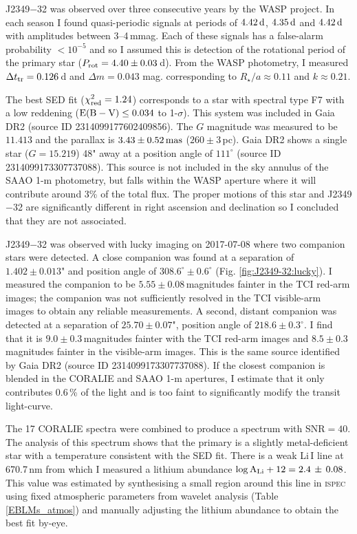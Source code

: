 J2349$-$32 was observed over three consecutive years by the WASP project. In each season I found quasi-periodic signals at periods of $4.42\, \rm d$, $4.35\, \rm d$ and $4.42\, \rm d$ with amplitudes between 3--4\,mmag. Each of these signals has a false-alarm probability $<10^{-5}$ and so I assumed this is detection of the rotational period of the primary star ($P_{\rm rot} = 4.40 \pm 0.03$\,d). From the WASP photometry, I measured $\Delta t_{\rm tr} = 0.126$\,d and $\Delta m = 0.043$ mag. corresponding to $R_\star / a \approx 0.11 $ and $k \approx 0.21$.

The best SED fit ($\chi_{\rm red}^2 = 1.24$) corresponds to a star with spectral type F7 with a low reddening ($\rm E(B \rm- \rm V) \leq 0.034$ to 1-$\sigma$). This system was included in Gaia DR2 (source ID 2314099177602409856). The $G$  magnitude was measured to be $11.413$ and the parallax is $3.43\pm 0.52\, \rm mas$ ($260 \pm 3$\,pc).  Gaia DR2 shows a single star ($G = 15.219$) 48" away at a position angle of $111^\circ$ (source ID 2314099173307737088). This source is not included in the sky annulus of the SAAO 1-m photometry, but falls within the WASP aperture where it will contribute around 3\% of the total flux. The proper motions of this star and J2349$-$32 are significantly different in right ascension and declination so I concluded that they are not associated.

J2349$-$32 was observed with lucky imaging on 2017-07-08 where two companion stars were detected. A close companion was found at a separation of $1.402 \pm 0.013$" and position angle of $308.6^{\circ} \pm 0.6^{\circ}$ (Fig. \ref{fig:J2349-32:lucky}). I measured the companion to be $5.55 \pm 0.08$\,magnitudes fainter in the TCI red-arm images; the companion was not sufficiently resolved in the TCI visible-arm images to obtain any reliable measurements. A second, distant companion was detected at a separation of $25.70 \pm 0.07$", position angle of $218.6 \pm 0.3^\circ$. I find that it is $9.0\pm0.3$\,magnitudes fainter with the TCI red-arm images and $8.5 \pm 0.3$\,magnitudes fainter in the visible-arm images. This is the same source identified by Gaia DR2 (source ID 2314099173307737088). If the closest companion is blended in the CORALIE and SAAO 1-m apertures, I estimate that it only contributes 0.6\,\% of the light and is too faint to significantly modify the transit light-curve. 

The 17 CORALIE spectra were combined to produce a spectrum with SNR$=40$. The analysis of this spectrum shows that the primary is a slightly metal-deficient star with a temperature consistent with the SED fit. There is a weak Li\,I line at 670.7\,nm from which I measured a lithium abundance $\log \rm A_{\rm Li}+12  = 2.4\,\pm \, 0.08$. This value was estimated by synthesising a small region around this line in \textsc{ispec} using fixed atmospheric parameters from wavelet analysis (Table \ref{EBLMs_atmos}) and manually adjusting the lithium abundance to obtain the best fit by-eye.


